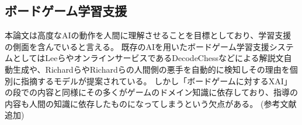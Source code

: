 \subsection{ボードゲーム学習支援}
本論文は高度なAIの動作を人間に理解させることを目標としており、学習支援の側面を含んでいると言える。
既存のAIを用いたボードゲーム学習支援システムとしてはLeeら\cite{ChessComments}やオンラインサービスであるDecodeChess\cite{DecodeChess}などによる解説文自動生成や、Richard\cite{badMoves2016}らやRichard\cite{badMoves2017}らの人間側の悪手を自動的に検知しその理由を個別に指摘するモデルが提案されている。
しかし「ボードゲームに対するXAI」の段での内容と同様にその多くがゲームのドメイン知識に依存しており、指導の内容も人間の知識に依存したものになってしまうという欠点がある。
(参考文献追加)


